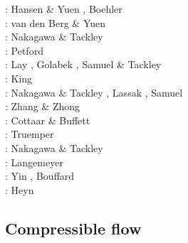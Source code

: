 \begin{scriptsize}
\nineteenninetysix: Hansen \& Yuen \cite{hayu96}, Boehler \cite{boeh96}\\
\nineteenninetyeight: van den Berg \& Yuen \cite{vayu98}\\
\twothousandfour: Nakagawa \& Tackley \cite{nata04c}\\
\twothousandseven: Petford \etal \cite{pery07}\\
\twothousandeight: Lay \etal \cite{lahb08}, Golabek \etal \cite{gost08}, Samuel \& Tackley \cite{sata08}\\
\twothousandnine: King \etal \cite{kisn09}\\
\twothousandten: Nakagawa \& Tackley \cite{nata10}, Lassak \etal \cite{lamg10}, Samuel \etal \cite{sate10}\\
\twothousandeleven: Zhang \& Zhong  \cite{zhzh11}\\
\twothousandtwelve: Cottaar \& Buffett  \cite{cobu12}\\
\twothousandtwelve: Truemper \etal  \cite{trbh12}\\
\twothousandthirteen: Nakagawa \& Tackley  \cite{nata13}\\
\twothousandeighteen: Langemeyer \etal  \cite{lalt18}\\
\twothousandnineteen: Yin \etal  \cite{yiym19}, Bouffard \etal \cite{bocl19}\\
\twothousandtwenty: Heyn \etal \cite{hect20}
\end{scriptsize}


\subsection{Compressible flow}

